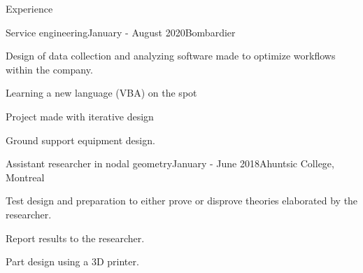 \documentclass{resume} %
\begin{document}
	\begin{rSection}{Experience}
		
		\begin{rSubsection}{Service engineering}{January - August 2020}{Bombardier}{}{}
			\item Design of data collection and analyzing software made to optimize workflows within the company.
			\item Learning a new language (VBA) on the spot
			\item Project made with iterative design
			\item Ground support equipment design.
		\end{rSubsection}
		
		\begin{rSubsection}{Assistant researcher in nodal geometry}{January - June 2018}{Ahuntsic College, Montreal}{}
			\item   Test design and preparation to either prove or disprove theories elaborated by the researcher.
			\item   Report results to the researcher.
			\item   Part design using a 3D printer.
		\end{rSubsection}
		
		
	\end{rSection}
	
	
	
\end{document}
